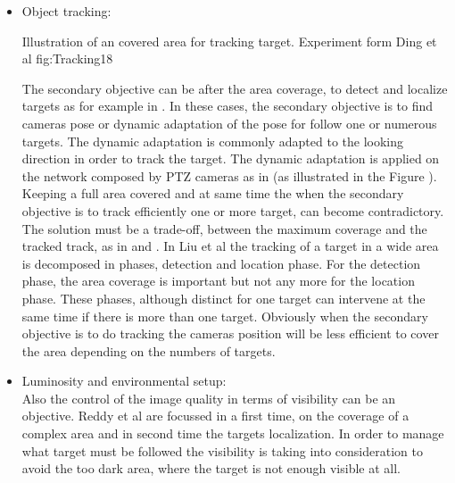 \begin{itemize}
\item Object tracking: \\
\begin{mfigures}[!]{ Illustration of an covered area for tracking target. Experiment  form Ding et al \citep{18*ding2012} }{fig:Tracking18} \centering
{}
\hspace{1cm} \\
\end{mfigures}	
 The secondary objective can be after the area coverage, to detect and localize targets as for example in \cite{18*ding2012,12*soto2009,23*liu2009,39*wu2011,40*sohrabi2000,22*zhao2008}. In these cases, the secondary objective is to find cameras pose or dynamic adaptation of the pose for follow one or numerous targets. The dynamic adaptation is commonly adapted to the looking direction in order to track the target. The dynamic adaptation is applied on the network composed by PTZ cameras as in \cite{18*ding2012,38*liu2010,12*soto2009} (as illustrated in the Figure \citep{18*ding2012}).
Keeping a full area covered and at same time the when the secondary objective is to track efficiently one or more target, can become contradictory. The solution must be a trade-off, between the maximum coverage and the tracked track, as in \cite{18*ding2012} and \cite{38*liu2010}.
 In Liu et al \cite{38*liu2010} the tracking of a target in a wide area is decomposed in phases, detection and location phase. For the detection phase, the area coverage is important but not any more for the location phase. These phases, although distinct for one target can intervene at the same time if there is more than one target. Obviously when the secondary objective is to do tracking the cameras position will be less efficient to cover the area depending on the numbers of targets.  \\

\item  Luminosity and environmental setup:\\ Also  the  control of the image quality in terms of visibility can be an objective. Reddy et al \cite{33*reddy2012} are focussed  in a first time, on  the coverage of a complex area and in second time the targets localization. In order to manage what target must be followed the visibility is taking into consideration to avoid the too dark area, where the target is not enough visible at all. \\


\end{itemize}

